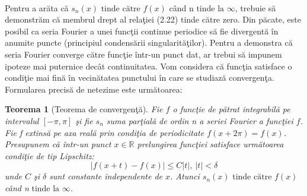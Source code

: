 \documentclass[a4paper,openany,12pt]{report}
\newtheorem{theorem}{Teorema}[section]
\begin{document}
\paragraph*{}Pentru a ar\u ata c\u a $s_n(x) \text{ tinde c\u atre } f(x)$ c\^ and n$\text{ tinde la }  \infty$, trebuie s\u a demonstr\u am c\u a membrul drept al rela\c tiei (2.22) tinde c\u atre zero. Din p\u acate, este posibil ca seria Fourier a unei func\c tii continue periodice s\u a fie divergent\u a \^ in anumite puncte (principiul condens\u arii singularit\u a\c tilor). Pentru a demonstra c\u a seria Fourier converge c\u atre func\c tie \^ intr-un punct dat, ar trebui s\u a impunem ipoteze mai puternice dec\^ at continuitatea. Vom considera c\u a func\c tia satisface o condi\c tie mai fin\u a \^ in vecin\u atatea punctului \^ in care se studiaz\u a convergen\c ta. Formularea precis\u a de netezime este urm\u atoarea:
\begin{theorem}[Teorema de convergen\c t\u a]
Fie $f$ o func\c tie de p\u atrat integrabil\u a pe intervalul $[-\pi, \pi]$ \c si fie $s_n$ suma par\c tial\u a de ordin n a seriei Fourier a func\c tiei $f$. Fie f extins\u a pe axa real\u a prin condi\c tia de periodicitate $f(x+2\pi)=f(x)$. Presupunem c\u a \^intr-un punct $x \in \mathbb{R}$ prelungirea func\c tiei satisface urm\u atoarea condi\c tie de tip Lipschitz:
\begin{equation*}
\left| f(x+t)-f(x) \right| \leq C\left|t\right|, \:\left|t\right|<\delta
\end{equation*}
unde $C$ \c si $\delta$ sunt constante independente de $x$. 
Atunci $s_n(x) \text{ tinde c\u atre } f(x)$ c\^ and n$\text{ tinde la }  \infty$.
\end{theorem}
\end{document}
